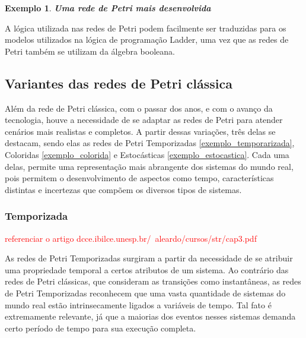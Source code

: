 \documentclass[
	12pt,				%
	openright,			%
	oneside,			%
	a4paper,			%
	english,			%
	brazil				%
	]{abntex2}
\newtheorem{exemplo}{Exemplo}
\begin{document}
\begin{exemplo} \textbf{Uma rede de Petri mais desenvolvida}
\label{exemplo_rede_petri_desenvolvidada}

\end{exemplo}

A lógica utilizada nas redes de Petri podem facilmente ser traduzidas para os modelos utilizados na lógica de programação Ladder, uma vez que as redes de Petri também se utilizam da álgebra booleana. 

    


\subsection*{Variantes das redes de Petri clássica}

Além da rede de Petri clássica, com o passar dos anos, e com o avanço da tecnologia, houve a necessidade de se adaptar as redes de Petri para atender cenários mais realistas e completos. A partir dessas variações, três delas se destacam, sendo elas as redes de Petri Temporizadas \ref{exemplo_temporarizada}, Coloridas \ref{exemplo_colorida} e Estocásticas \ref{exemplo_estocastica}. Cada uma delas, permite uma representação mais abrangente dos sistemas do mundo real, pois permitem o desenvolvimento de aspectos como tempo, características distintas e incertezas que compõem os diversos tipos de sistemas.


\subsubsection*{Temporizada}

\textcolor{red}{referenciar o artigo dcce.ibilce.unesp.br/~aleardo/cursos/str/cap3.pdf }

As redes de Petri Temporizadas surgiram a partir da necessidade de se atribuir uma propriedade temporal a certos atributos de um sistema. Ao contrário das redes de Petri clássicas, que consideram as transições como instantâneas, as redes de Petri Temporizadas reconhecem que uma vasta quantidade de sistemas do mundo real estão intrinsecamente ligados a variáveis de tempo. Tal fato é extremamente relevante, já que a maiorias dos eventos nesses sistemas demanda certo período de tempo para sua execução completa.
\end{document}
